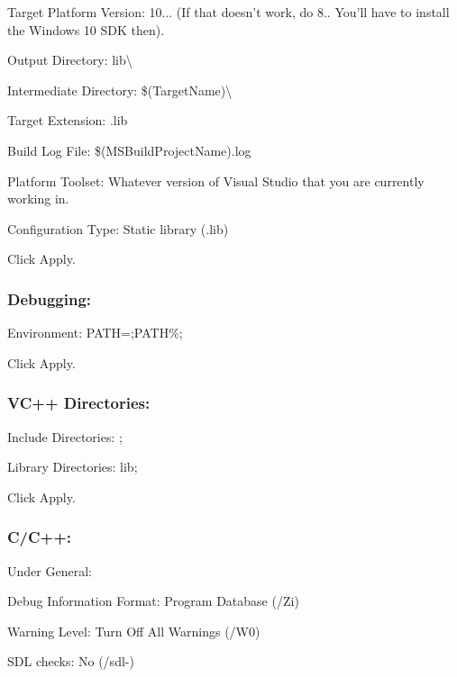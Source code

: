 \begin{DoxyItemize}
\item {\ttfamily Target Platform Version\-:} 10... (If that doesn't work, do 8.. You'll have to install the Windows 10 S\-D\-K then).
\item {\ttfamily Output Directory\-:} lib\textbackslash{}
\item {\ttfamily Intermediate Directory\-:} \$(Target\-Name)\textbackslash{}
\item {\ttfamily Target Extension\-:} .lib
\item {\ttfamily Build Log File\-:} \$(M\-S\-Build\-Project\-Name).log
\item {\ttfamily Platform Toolset\-:} Whatever version of Visual Studio that you are currently working in.
\item {\ttfamily Configuration Type\-:} Static library (.lib)
\end{DoxyItemize}

Click {\ttfamily Apply}.

\subsubsection*{Debugging\-:}


\begin{DoxyItemize}
\item {\ttfamily Environment\-:} P\-A\-T\-H=;P\-A\-T\-H\%;
\end{DoxyItemize}

Click {\ttfamily Apply}.

\subsubsection*{V\-C++ Directories\-:}


\begin{DoxyItemize}
\item {\ttfamily Include Directories\-:} ;
\item {\ttfamily Library Directories\-:} lib;
\end{DoxyItemize}

Click {\ttfamily Apply}.

\subsubsection*{C/\-C++\-:}

Under {\ttfamily General}\-:


\begin{DoxyItemize}
\item {\ttfamily Debug Information Format\-:} Program Database (/\-Zi)
\item {\ttfamily Warning Level\-:} Turn Off All Warnings (/\-W0)
\item {\ttfamily S\-D\-L checks\-:} No (/sdl-\/)
\end{DoxyItemize}

